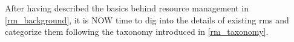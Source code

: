 After having described the basics behind resource management in \autoref{rm_background}, it is NOW time to dig into the details of existing \glspl{rm} and categorize them following the taxonomy introduced in \autoref{rm_taxonomy}.